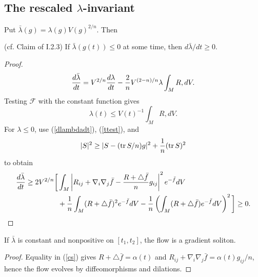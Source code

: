 \subsection{The rescaled $\lambda$-invariant}

Put $\bar\lambda(g)=\lambda(g)V(g)^{2/n}$. Then
\begin{proposition}
  \label{prop:kl-rescaled-invariant-monotonicity-rescaled-lambda-invariant}
  \label{expandingprop} (cf. Claim of I.2.3)
If $\bar\lambda(g(t))\le0$ at some time, then $d\bar\lambda/dt\ge0$.
\end{proposition}
\begin{proof}
\sketch
\begin{equation}
{d\bar\lambda\over dt}=V^{2/n}{d\lambda\over dt}-{2\over n}V^{(2-n)/n}\lambda\int_MR,dV.
\end{equation}
Testing ${\mathcal F}$ with the constant function gives
\begin{equation}\label{ttest}\lambda(t)\le V(t)^{-1}\int_MR,dV.
\end{equation}
For $\lambda\le0$, use (\ref{dlambdadt}), (\ref{ttest}), and
\[|S|^2\ge|S-({\operatorname{tr} S/n})g|^2+{1\over n}(\operatorname{tr} S)^2\]
to obtain
\begin{align}\label{cs}
{d\bar\lambda\over dt}\ge2V^{2/n}\bigg[&\int_M\left|R_{ij}+\nabla_i\nabla_j\bar f-{R+\triangle\bar f\over n}g_{ij}\right|^2e^{-\bar f}dV\\
&+{1\over n}\int_M(R+\triangle\bar f)^2e^{-\bar f}dV-{1\over n}\left(\int_M(R+\triangle\bar f)e^{-\bar f}dV\right)^2\bigg]\ge0.
\end{align}
\end{proof}

\begin{corollary}
  \label{cor:kl-rescaled-invariant-rigidity-at-constant-rescaled-lambda}
  \label{expp}
If $\bar\lambda$ is constant and nonpositive on $[t_1,t_2]$, the flow is a
gradient soliton.
\end{corollary}
\begin{proof}
\sketch
Equality in (\ref{cs}) gives $R+\triangle\bar f=\alpha(t)$ and
$R_{ij}+\nabla_i\nabla_j\bar f=\alpha(t)g_{ij}/n$, hence the flow evolves by
diffeomorphisms and dilations.
\end{proof}

